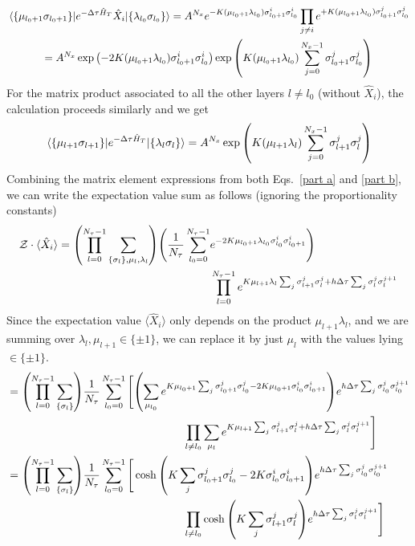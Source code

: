 \documentclass[../thesis_main.tex]{subfiles}
\begin{document}
\begin{gather}
    \mel{\{\mu_{l_0+1} \sigma _{l_0+1}\}}{e^{-\Delta \tau \hat{H}_T} \hat{X}_i}{\{\lambda_{l_0} \sigma _{l_0}\}} = A^{N_x} e^{-K(\mu_{l_0 + 1} \lambda_{l_0})\sigma^i_{l_0+1} \sigma^i_{l_0}} \prod_{j \neq i} e^{+ K(\mu_{l_0 + 1} \lambda_{l_0})\sigma^j_{l_0+1} \sigma^j_{l_0}} \nonumber \\
    = A^{N_x} \exp\qty(-2K(\mu_{l_0 + 1} \lambda_{l_0})\sigma^i_{l_0+1} \sigma^i_{l_0}) \exp\qty( K(\mu_{l_0 + 1} \lambda_{l_0}) \sum_{j = 0}^{N_x-1} \sigma^j_{l_0+1} \sigma^j_{l_0}) 
    \label{part a}
\end{gather}
For the matrix product associated to all the other layers $l \neq l_0$ (without $\hat{X}_i$), the calculation proceeds similarly and we get
\begin{equation}
    \mel{\{\mu_{l+1} \sigma _{l+1}\}}{e^{-\Delta \tau \hat{H}_T}}{\{\lambda_{l} \sigma _{l}\}} = A^{N_x}
    \exp\qty(K(\mu_{l + 1} \lambda_{l}) \sum_{j = 0}^{N_x-1} \sigma^j_{l+1} \sigma^j_{l})
    \label{part b}
\end{equation}
Combining the matrix element expressions from both Eqs.~\eqref{part a} and \eqref{part b}, we can write the expectation value sum as follows (ignoring the proportionality constants)
\begin{align}
    \mathcal{Z} \cdot \langle \hat{X}_i \rangle = \qty(\prod_{l=0}^{N_\tau - 1} \sum_{\{\sigma_l \}, \mu_l, \lambda_l}) \Bigg(\frac{1}{N_\tau} \sum_{l_0 = 0}^{N_\tau - 1} & e^{-2K \mu_{l_0 + 1} \lambda_{l_0} \sigma^{i}_{l_0} \sigma^{i}_{l_0 + 1}}\Bigg)  \nonumber \\ 
    & \prod_{l = 0}^{N_\tau - 1} e^{K \mu_{l+1} \lambda_l \sum_j \sigma^j_{l+1} \sigma ^j_l + h \Delta \tau \sum_j \sigma^j_l \sigma^{j+1}_l}
\end{align}
Since the expectation value $\langle \hat{X}_i \rangle$ only depends on the product $\mu_{l+1}\lambda_l$, and we are summing over $\lambda_l, \mu_{l+1} \in \{\pm 1\}$, we can replace it by just $\mu_l$ with the values lying $\in \{\pm 1\}$.
\begin{align}
    & =  \qty(\prod_{l=0}^{N_\tau - 1} \sum_{\{\sigma_l \}}) \frac{1}{N_\tau} \sum_{l_0 = 0}^{N_\tau - 1} \Bigg[\qty(\sum_{\mu_{l_0}} e^{K \mu_{l_0+1} \sum_j \sigma^j_{l_0+1} \sigma^j_{l_0} - 2K \mu_{l_0 + 1}  \sigma^{i}_{l_0} \sigma^{i}_{l_0 + 1}}) e^{ h \Delta \tau  \sum_j \sigma^j_{l_0} \sigma^{j+1}_{l_0}} \nonumber \\
    & \qquad\qquad\qquad\qquad\qquad\qquad\qquad\qquad\prod_{l \neq l_0} \sum_{\mu_{l}} e^{K \mu_{l+1} \sum_j \sigma^j_{l+1} \sigma ^j_l + h \Delta \tau  \sum_j \sigma^j_l \sigma^{j+1}_l} \Bigg] \nonumber \\
    & = \qty(\prod_{l=0}^{N_\tau - 1} \sum_{\{\sigma_l \}}) \frac{1}{N_\tau} \sum_{l_0 = 0}^{N_\tau - 1} \Bigg[ \cosh\qty(K \sum_j \sigma^j_{l_0+1} \sigma^j_{l_0} - 2K \sigma^{i}_{l_0} \sigma^{i}_{l_0 + 1}) e^{ h \Delta \tau  \sum_j \sigma^j_{l_0} \sigma^{j+1}_{l_0}} \nonumber \\
    &   \qquad\qquad\qquad\qquad\qquad\qquad\qquad\qquad\prod_{l \neq l_0} \cosh\qty(K \sum_j \sigma^j_{l+1} \sigma ^j_l) e^{h \Delta \tau  \sum_j \sigma^j_l \sigma^{j+1}_l} \Bigg] 
    \label{almostfinal}
\end{align}
\end{document}
